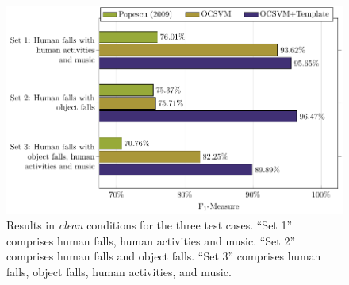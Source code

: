 \begin{figure}[htbp]
	\centering
	\includegraphics[width=\columnwidth]{img/cin/res_clean.pdf}
	\caption{Results in \textit{clean} conditions for the three test cases. ``Set 1'' comprises human falls, human activities and music. ``Set 2'' comprises human falls and object falls. ``Set 3'' comprises human falls, object falls, human activities, and music.} \label{fig:res_clean_}
\end{figure}

